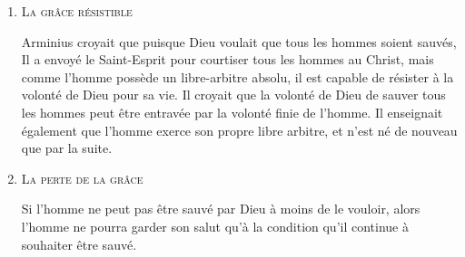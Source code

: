 \begin{enumerate}
  \item  \textsc{La grâce résistible}

\nobreak
Arminius croyait que puisque Dieu voulait que tous les hommes soient sauvés,
 Il a envoyé le Saint-Esprit pour \og courtiser \fg{}
 tous les hommes au Christ,
 mais comme l'homme \pocketlinebreak
 possède un \og libre-arbitre \fg{} absolu, il est capable de résister
 à la volonté de Dieu pour sa vie.
 Il croyait que la volonté de Dieu de sauver tous les hommes peut être
 entravée par la volonté finie de l'homme.
 Il enseignait également que l'homme exerce son propre libre arbitre,
 et n'est né de nouveau que par la suite.

  \item \textsc{La perte de la grâce}

\nobreak
\begin{pocketpar}{}
Si l'homme ne peut pas être sauvé par Dieu à moins de le vouloir,
 alors l'homme ne pourra garder son salut qu'à la condition
 qu'il continue à souhaiter être sauvé.
\end{pocketpar}

\end{enumerate}


\closechapter


